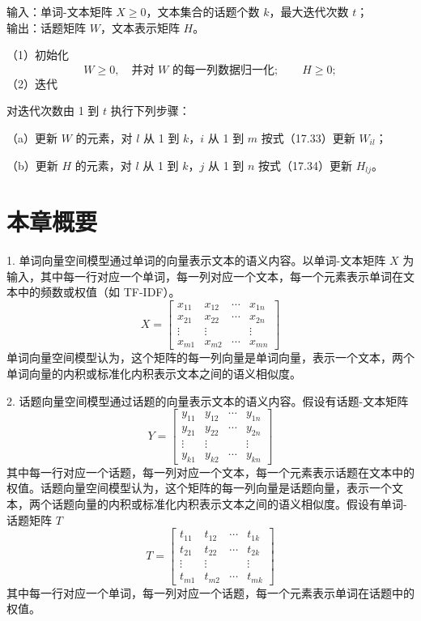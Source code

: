 \documentclass[UTF8, 12pt, fontset=fandol, oneside]{ctexart}
\begin{document}
\noindent 输入：单词-文本矩阵 $X\geqslant 0$，文本集合的话题个数 $k$，最大迭代次数 $t$；\\
输出：话题矩阵 $W$，文本表示矩阵 $H$。

（1）初始化
\[
W\geqslant 0,\quad \text{并对 }W\text{ 的每一列数据归一化};\qquad H\geqslant 0;
\]
（2）迭代

对迭代次数由 1 到 $t$ 执行下列步骤：

（a）更新 $W$ 的元素，对 $l$ 从 1 到 $k$，$i$ 从 1 到 $m$ 按式（17.33）更新 $W_{il}$；

（b）更新 $H$ 的元素，对 $l$ 从 1 到 $k$，$j$ 从 1 到 $n$ 按式（17.34）更新 $H_{lj}$。

\section*{本章概要}

1. 单词向量空间模型通过单词的向量表示文本的语义内容。以单词-文本矩阵 $X$ 为输入，其中每一行对应一个单词，每一列对应一个文本，每一个元素表示单词在文本中的频数或权值（如 TF-IDF）。
\[
X=
\begin{bmatrix}
x_{11} & x_{12} & \cdots & x_{1n}\\
x_{21} & x_{22} & \cdots & x_{2n}\\
\vdots & \vdots & & \vdots\\
x_{m1} & x_{m2} & \cdots & x_{mn}
\end{bmatrix}
\]
单词向量空间模型认为，这个矩阵的每一列向量是单词向量，表示一个文本，两个单词向量的内积或标准化内积表示文本之间的语义相似度。

2. 话题向量空间模型通过话题的向量表示文本的语义内容。假设有话题-文本矩阵
\[
Y=
\begin{bmatrix}
y_{11} & y_{12} & \cdots & y_{1n}\\
y_{21} & y_{22} & \cdots & y_{2n}\\
\vdots & \vdots & & \vdots\\
y_{k1} & y_{k2} & \cdots & y_{kn}
\end{bmatrix}
\]
其中每一行对应一个话题，每一列对应一个文本，每一个元素表示话题在文本中的权值。话题向量空间模型认为，这个矩阵的每一列向量是话题向量，表示一个文本，两个话题向量的内积或标准化内积表示文本之间的语义相似度。假设有单词-话题矩阵 $T$
\[
T=
\begin{bmatrix}
t_{11} & t_{12} & \cdots & t_{1k}\\
t_{21} & t_{22} & \cdots & t_{2k}\\
\vdots & \vdots & & \vdots\\
t_{m1} & t_{m2} & \cdots & t_{mk}
\end{bmatrix}
\]
其中每一行对应一个单词，每一列对应一个话题，每一个元素表示单词在话题中的权值。
\end{document}
